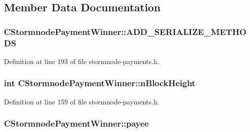 \subsection{Member Data Documentation}
\hypertarget{class_c_stormnode_payment_winner_a9ba373fe06c70312bfa36ec7c41d71cf}{}
\subsubsection[{A\+D\+D\+\_\+\+S\+E\+R\+I\+A\+L\+I\+Z\+E\+\_\+\+M\+E\+T\+H\+O\+D\+S}]{\setlength{\rightskip}{0pt plus 5cm}C\+Stormnode\+Payment\+Winner\+::\+A\+D\+D\+\_\+\+S\+E\+R\+I\+A\+L\+I\+Z\+E\+\_\+\+M\+E\+T\+H\+O\+D\+S}\label{class_c_stormnode_payment_winner_a9ba373fe06c70312bfa36ec7c41d71cf}


Definition at line 193 of file stormnode-\/payments.\+h.

\hypertarget{class_c_stormnode_payment_winner_a22c766c132714906e267465def62cbcd}{}
\subsubsection[{n\+Block\+Height}]{\setlength{\rightskip}{0pt plus 5cm}int C\+Stormnode\+Payment\+Winner\+::n\+Block\+Height}\label{class_c_stormnode_payment_winner_a22c766c132714906e267465def62cbcd}


Definition at line 159 of file stormnode-\/payments.\+h.

\hypertarget{class_c_stormnode_payment_winner_abbba3ee9d4620fcec320826f03ffc7e4}{}
\subsubsection[{payee}]{ C\+Stormnode\+Payment\+Winner\+::payee}\label{class_c_stormnode_payment_winner_abbba3ee9d4620fcec320826f03ffc7e4}


